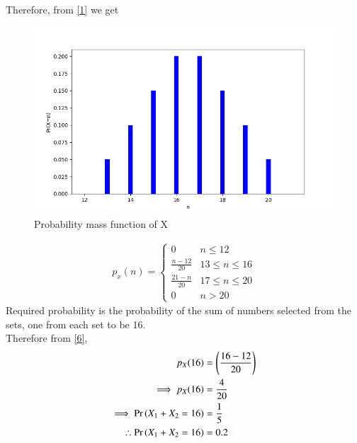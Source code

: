 \documentclass[journal,12pt,twocolumn]{IEEEtran}
\begin{document}
Therefore, from \eqref{1} we get
\begin{figure}[!hbt]
    \centering
    \includegraphics[width=\columnwidth]{Figure_1.png}
    \caption{Probability mass function of X}
    \label{Figure_1}
\end{figure}
\begin{align}
    p_x(n) = 
    \begin{cases}
    0 & n \leq 12\\
    \frac{n-12}{20}  & 13 \leq n \leq 16\\
    \frac{21-n}{20}  & 17 \leq n \leq 20\\
    0 & n>20
    \end{cases}\label{6}
\end{align}
Required probability is the probability of the sum of numbers selected from the sets, one from each set to be 16.\\
Therefore from \eqref{6},
\begin{align}
    p_X(16) &= \left(\frac{16-12}{20}\right)\\
    \implies p_X(16) &= \frac{4}{20}\\
    \implies\Pr\left(X_1+X_2=16\right) &= \frac{1}{5} \\
    \therefore \Pr\left(X_1+X_2=16\right)  &= 0.2
\end{align}
\end{document}
